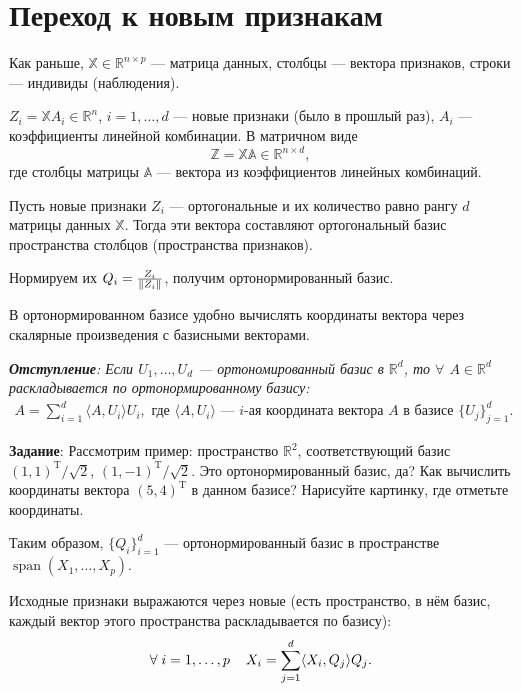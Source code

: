 \documentclass[specialist, 12pt,
subf, %
href, colorlinks=true,
substylefile = spbu.rtx,
]{disser}
\DeclareMathOperator{\spn}{span}
\begin{document}
	
\section{Переход к новым признакам}

Как раньше, $\mathbb{X} \in \mathbb{R}^{n \times p}$ --- матрица данных, столбцы --- вектора признаков, строки --- индивиды (наблюдения).

 $Z_i = \mathbb{X} A_i \in \mathbb{R}^n$, $i=1,\ldots,d$ --- новые признаки (было в прошлый раз), $A_i$ --- коэффициенты линейной комбинации. В матричном виде $$\mathbb{Z} = \mathbb{X} \mathbb{A} \in \mathbb{R}^{n \times d},$$ где столбцы матрицы $\mathbb{A}$ --- вектора из коэффициентов линейных комбинаций.

Пусть новые признаки $Z_i$ --- ортогональные и их количество равно рангу $d$ матрицы данных $\mathbb{X}$. Тогда эти вектора составляют ортогональный базис пространства столбцов (пространства признаков).

Нормируем их $Q_i = \frac{Z_i}{\Arrowvert Z_i\Arrowvert}$, получим ортонормированный базис.

В ортонормированном базисе удобно вычислять координаты вектора через скалярные произведения с базисными векторами.

{\it\small
\textbf{Отступление}:
Если $U_1, \ldots, U_d$ --- ортономированный базис в $\mathbb{R}^d$, то $\forall$ $A \in \mathbb{R}^d$ раскладывается по ортонормированному базису:
\begin{gather*}
A = \sum\limits_{i = 1}^d \langle A, U_i \rangle U_i, \text{ где $\langle A, U_i\rangle$ --- $i$-ая координата вектора $A$ в базисе $\{U_j\}_{j = 1}^d$.}
\end{gather*}

\textbf{Задание}:
 {Рассмотрим пример: пространство $\mathbb{R}^2$, соответствующий базис $(1,1)^{\mathrm{T}}/\sqrt{2}$, $(1,-1)^{\mathrm{T}}/\sqrt{2}$. Это ортонормированный базис, да? Как вычислить координаты вектора $(5, 4)^{\mathrm{T}}$ в данном базисе? Нарисуйте картинку, где отметьте координаты.
}
}

\medskip
Таким образом, $\{Q_i\}_{i=1}^d$ --- ортонормированный базис в пространстве $\spn(X_1, \ldots, X_p)$.


	Исходные признаки выражаются через новые (есть пространство, в нём базис, каждый вектор этого пространства раскладывается по базису):
	\begin{gather}\label{1}
	\forall \hspace{0.1 cm} i = 1,\ldots,p \hspace{0.4 cm} X_i = \sum\limits_{j = 1}^d \langle X_i, Q_j\rangle Q_j.
	\end{gather}
\end{document}
